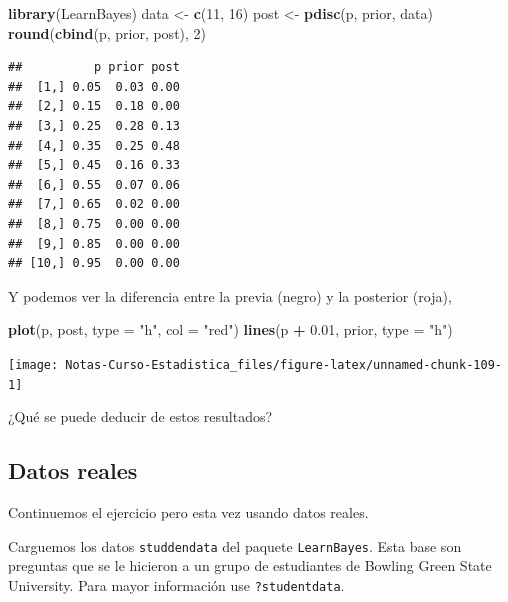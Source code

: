 \documentclass[
  12pt,
]{book}
\newenvironment{Shaded}{\begin{snugshade}}{\end{snugshade}}
\newcommand{\DataTypeTok}[1]{\textcolor[rgb]{0.13,0.29,0.53}{#1}}
\newcommand{\DecValTok}[1]{\textcolor[rgb]{0.00,0.00,0.81}{#1}}
\newcommand{\FloatTok}[1]{\textcolor[rgb]{0.00,0.00,0.81}{#1}}
\newcommand{\KeywordTok}[1]{\textcolor[rgb]{0.13,0.29,0.53}{\textbf{#1}}}
\newcommand{\NormalTok}[1]{#1}
\newcommand{\OperatorTok}[1]{\textcolor[rgb]{0.81,0.36,0.00}{\textbf{#1}}}
\newcommand{\StringTok}[1]{\textcolor[rgb]{0.31,0.60,0.02}{#1}}
\theoremstyle{definition}
\theoremstyle{definition}
\theoremstyle{definition}
\theoremstyle{remark}
\begin{document}
\begin{Shaded}
\begin{Highlighting}[]
\KeywordTok{library}\NormalTok{(LearnBayes)}
\NormalTok{data <-}\StringTok{ }\KeywordTok{c}\NormalTok{(}\DecValTok{11}\NormalTok{, }\DecValTok{16}\NormalTok{)}
\NormalTok{post <-}\StringTok{ }\KeywordTok{pdisc}\NormalTok{(p, prior, data)}
\KeywordTok{round}\NormalTok{(}\KeywordTok{cbind}\NormalTok{(p, prior, post), }\DecValTok{2}\NormalTok{)}
\end{Highlighting}
\end{Shaded}

\begin{verbatim}
##          p prior post
##  [1,] 0.05  0.03 0.00
##  [2,] 0.15  0.18 0.00
##  [3,] 0.25  0.28 0.13
##  [4,] 0.35  0.25 0.48
##  [5,] 0.45  0.16 0.33
##  [6,] 0.55  0.07 0.06
##  [7,] 0.65  0.02 0.00
##  [8,] 0.75  0.00 0.00
##  [9,] 0.85  0.00 0.00
## [10,] 0.95  0.00 0.00
\end{verbatim}

Y podemos ver la diferencia entre la previa (negro) y la posterior
(roja),

\begin{Shaded}
\begin{Highlighting}[]
\KeywordTok{plot}\NormalTok{(p, post, }\DataTypeTok{type =} \StringTok{"h"}\NormalTok{, }\DataTypeTok{col =} \StringTok{"red"}\NormalTok{)}
\KeywordTok{lines}\NormalTok{(p }\OperatorTok{+}\StringTok{ }\FloatTok{0.01}\NormalTok{, prior, }\DataTypeTok{type =} \StringTok{"h"}\NormalTok{)}
\end{Highlighting}
\end{Shaded}

\begin{center}\texttt{[image: Notas-Curso-Estadistica\_files/figure-latex/unnamed-chunk-109-1]} \end{center}

¿Qué se puede deducir de estos resultados?

\hypertarget{datos-reales}{%
\subsection{Datos reales}\label{datos-reales}}

Continuemos el ejercicio pero esta vez usando datos reales.

Carguemos los datos \texttt{studdendata} del paquete \texttt{LearnBayes}. Esta base
son preguntas que se le hicieron a un grupo de estudiantes de Bowling
Green State University. Para mayor información use \texttt{?studentdata}.
\end{document}
